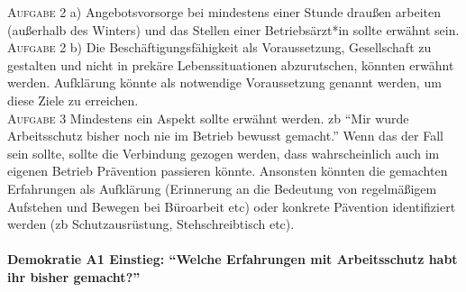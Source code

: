 \textsc{Aufgabe 2} a) \quad
Angebotsvorsorge bei mindestens einer Stunde draußen arbeiten (außerhalb des Winters) und das Stellen einer Betriebsärzt*in sollte erwähnt sein. 
\\

\textsc{Aufgabe 2} b) \quad
Die Beschäftigungsfähigkeit als Voraussetzung, Gesellschaft zu gestalten und nicht in prekäre Lebenssituationen abzurutschen, könnten erwähnt werden. 
Aufklärung könnte als notwendige Voraussetzung genannt werden, um diese Ziele zu erreichen.
\\

\textsc{Aufgabe 3} \quad
Mindestens ein Aspekt sollte erwähnt werden. \Gls{zb} \enquote{Mir wurde Arbeitsschutz bisher noch nie im Betrieb bewusst gemacht.}
Wenn das der Fall sein sollte, sollte die Verbindung gezogen werden, dass wahrscheinlich auch im eigenen Betrieb Prävention passieren könnte. 
Ansonsten könnten die gemachten Erfahrungen als Aufklärung (Erinnerung an die Bedeutung von regelmäßigem Aufstehen und Bewegen bei Büroarbeit \gls{etc}) oder konkrete Pävention identifiziert werden (\gls{zb} Schutzausrüstung, Stehschreibtisch \gls{etc}).



\paragraph{Demokratie A1 Einstieg: \enquote{Welche Erfahrungen mit Arbeitsschutz habt ihr bisher gemacht?} \label{DemokratieA1}} 

